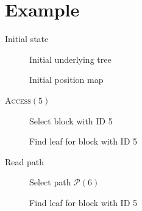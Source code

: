 


\section{Example}

	\begin{frame}{Initial state}

		\begin{figure}
			\centering

			
			\caption{Initial underlying tree}
		\end{figure}

		\vspace{-12pt}

		\begin{figure}
			\centering

			
			\caption{Initial position map}
		\end{figure}	
		
	\end{frame}

	\begin{frame}{\textsc{Access}$(5)$}
		
		\selectedtrue%

		\begin{figure}
			\centering

			
			\caption{Select block with ID 5}
		\end{figure}		

		\vspace{-12pt}

		\begin{figure}
			\centering

			
			\caption{Find leaf for block with ID 5}
		\end{figure}	
		
	\end{frame}

	\begin{frame}{Read path}
		
		\selectedtrue%
		\pathreadtrue%

		\begin{figure}
			\centering

			
			\caption{Select path $\mathcal{P}(6)$}
		\end{figure}		

		\vspace{-12pt}

		\begin{figure}
			\centering

			
			\caption{Find leaf for block with ID 5}
		\end{figure}	
		
	\end{frame}

